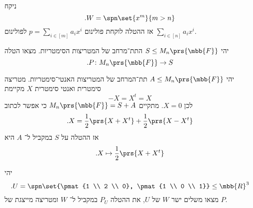 \documentclass[a4paper,10pt,oneside,openany]{article}
\begin{document}
\begin{solution}
ניקח
\[\text{.} W = \spn\set{x^m}{m > n}\]
אז ההטלה לוקחת פולינום
$p = \sum_{i \in [m]} a_i x^i$
לפולינום
$\sum_{i \in [n]} a_i x^i$.
\end{solution}

\begin{exercise}
יהי
$S \leq M_n\prs{\mbb{F}}$
התת־מרחב של המטריצות הסימטריות.
מצאו הטלה
\[\text{.} P \colon M_n\prs{\mbb{F}} \to S\]
\end{exercise}

\begin{solution}
יהי
$A \leq M_n\prs{\mbb{F}}$
תת־המרחב של המטריצות האנטי־סימטריות.
מטריצה סימטרית ואנטי סימטרית
$X$
מקיימת
\[-X = X^t = X\]
לכן
$X = 0$.
מתקיים
$M_n\prs{\mbb{F}} = S + A$
כי אפשר לכתוב
\[\text{.} X = \frac{1}{2} \prs{X + X^t} + \frac{1}{2} \prs{X - X^t}\]
אז ההטלה על
$S$
במקביל ל־%
$A$
היא
\[\text{.} X \mapsto \frac{1}{2} \prs{X + X^t}\]
\end{solution}

\begin{exercise}
יהי
\[\text{.} U = \spn\set{\pmat{1 \\ 2 \\ 0}, \pmat{1 \\ 0 \\ 1}} \leq \mbb{R}^3\]
מצאו משלים ישר
$W$
של
$U$,
את ההטלה
$P_U$
במקביל ל־%
$W$
ומטריצה מייצגת של
$P$.
\end{exercise}
\end{document}
